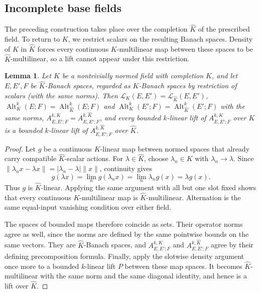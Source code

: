 \documentclass[11pt]{amsart}
\newtheorem{lemma}[theorem]{Lemma}
\theoremstyle{definition}
\theoremstyle{remark}
\numberwithin{equation}{section}
\newcommand{\cL}{\mathcal L}
\newcommand{\Alt}{\operatorname{Alt}}
\newcommand{\abs}[1]{\lvert #1\rvert}
\newcommand{\norm}[1]{\lVert #1\rVert}
\newcommand{\Kh}{\widehat K}
\begin{document}
\subsection{Incomplete base fields}
The preceding construction takes place over the completion $\Kh$ of the prescribed field. To return to $K$,
we restrict scalars on the resulting Banach spaces. Density of $K$ in $\Kh$ forces every continuous
$K$\nobreakdash-multilinear map between these spaces to be $\Kh$\nobreakdash-multilinear, so a lift cannot appear under
this restriction.

\begin{lemma}\label{lem:descent}
Let $K$ be a nontrivially normed field with completion $\Kh$, and let $E,E',F$ be $\Kh$\nobreakdash-Banach spaces, regarded as
$K$\nobreakdash-Banach spaces by restriction of scalars (with the same norms). Then $\cL_K(E,E')=\cL_{\Kh}(E,E')$,
$\Alt^k_K(E;F)=\Alt^k_{\Kh}(E;F)$ and $\Alt^k_K(E';F)=\Alt^k_{\Kh}(E';F)$ with the same norms, $A^{k,K}_{E,E';F}=A^{k,\Kh}_{E,E';F}$,
and every bounded $k$\nobreakdash-linear lift of $A^{k,K}_{E,E';F}$ over $K$ is a bounded $k$\nobreakdash-linear lift of $A^{k,\Kh}_{E,E';F}$ over
$\Kh$.
\end{lemma}

\begin{proof}
Let $g$ be a continuous $K$\nobreakdash-linear map between normed spaces that already carry compatible
$\Kh$\nobreakdash-scalar actions. For $\lambda\in\Kh$, choose $\lambda_n\in K$ with $\lambda_n\to\lambda$.
Since $\norm{\lambda_nx-\lambda x}=\abs{\lambda_n-\lambda}\norm x$, continuity gives
\[
g(\lambda x)=\lim_n g(\lambda_nx)=\lim_n\lambda_ng(x)=\lambda g(x).
\]
Thus $g$ is $\Kh$\nobreakdash-linear. Applying the same argument with all but one slot fixed shows that every
continuous $K$\nobreakdash-multilinear map is $\Kh$\nobreakdash-multilinear. Alternation is the same equal-input
vanishing condition over either field.

The spaces of bounded maps therefore coincide as sets. Their operator norms agree as well, since the norms are
defined by the same pointwise bounds on the same vectors. They are $\Kh$\nobreakdash-Banach spaces, and
$A^{k,K}_{E,E';F}$ and $A^{k,\Kh}_{E,E';F}$ agree by their defining precomposition formula.
Finally, apply the slotwise density argument once more to a bounded $k$\nobreakdash-linear lift $P$ between these
map spaces. It becomes $\Kh$\nobreakdash-multilinear with the same norm and the same diagonal identity, and hence
is a lift over $\Kh$.
\end{proof}
\end{document}
